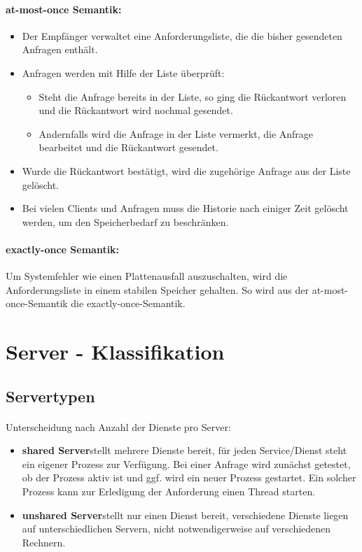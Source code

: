 \documentclass[a4paper]{article}
\begin{document}
		\paragraph{\textbf{at-most-once Semantik:}}
			\begin{itemize}
				\item Der Empfänger verwaltet eine Anforderungsliste, die die bisher gesendeten Anfragen enthält.
				\item Anfragen werden mit Hilfe der Liste überprüft:
					\begin{itemize}
						\item Steht die Anfrage bereits in der Liste, so ging die Rückantwort verloren und die Rückantwort wird nochmal gesendet.
						\item Andernfalls wird die Anfrage in der Liste vermerkt, die Anfrage bearbeitet und die Rückantwort gesendet.
					\end{itemize}
				\item Wurde die Rückantwort bestätigt, wird die zugehörige Anfrage aus der Liste gelöscht.
				\item Bei vielen Clients und Anfragen muss die Historie nach einiger Zeit gelöscht werden, um den Speicherbedarf zu beschränken.				
			\end{itemize}
		\paragraph{exactly-once Semantik:}Um Systemfehler wie einen Plattenausfall auszuschalten, wird die Anforderungsliste in einem stabilen Speicher gehalten. So wird aus der at-most-once-Semantik die exactly-once-Semantik.
		\pagebreak
\section{Server - Klassifikation}
	\subsection{Servertypen}
		\paragraph{} Unterscheidung nach Anzahl der Dienste pro Server:
			\begin{itemize}
				\item \textbf{shared Server}stellt mehrere Dienste bereit, für jeden Service/Dienst steht ein eigener Prozess zur Verfügung. Bei einer Anfrage wird zunächst getestet, ob der Prozess aktiv ist und ggf. wird ein neuer Prozess gestartet. Ein solcher Prozess kann zur Erledigung der Anforderung einen Thread starten.
				\item \textbf{unshared Server}stellt nur einen Dienst bereit, verschiedene Dienste liegen auf unterschiedlichen Servern, nicht notwendigerweise auf verschiedenen Rechnern.
			\end{itemize}
\end{document}

